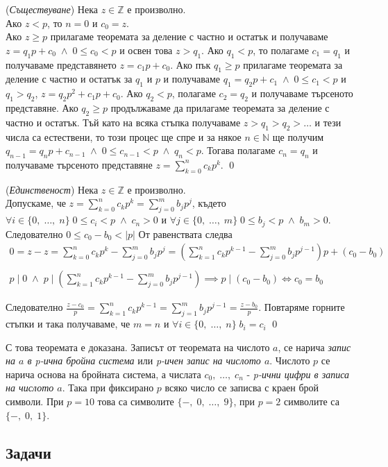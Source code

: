 \documentclass[a4paper, 12pt, oneside]{article}
\theoremstyle{definition}
\renewenvironment{proof}{\noindent{\bf Доказателство.}\hspace*{1em}}{\qed\par}
\newcommand{\Z}{\mathbb{Z}}
\newcommand{\N}{\mathbb{N}}
\begin{document}
\begin{proof}
    (\textit{Съществуване})
    Нека $z \in \Z$ е произволно. \\

    Ако $z < p$, то $n = 0$ и $c_0 = z$. \\

    Ако $z \geq p$ прилагаме теоремата за деление с частно и остатък и получаваме $z = q_1p + c_0 \; \land \; 0 \leq c_0 < p$
    и освен това $z > q_1$. Ако $q_1 < p$, то полагаме $c_1 = q_1$
    и получаваме представянето $z = c_1p + c_0$.
    Ако пък $q_1 \geq p$ прилагаме теоремата за деление с частно и остатък за $q_1$ и $p$ и получаваме
    $q_1 = q_2p + c_1 \; \land \; 0 \leq c_1 < p$ и $q_1 > q_2$, $z = q_2p^2 + c_1p + c_0$. Ако $q_2 < p$,
    полагаме $c_2 = q_2$ и получаваме търсеното представяне. Ако $q_2 \geq p$ продължаваме да прилагаме
    теоремата за деление с частно и остатък. Тъй като на всяка стъпка получаваме $z > q_1 > q_2 > \dots$
    и тези числа са естествени, то този процес ще спре и за някое $n \in \N$ ще получим
    $q_{n - 1} = q_np + c_{n - 1} \; \land \; 0 \leq c_{n - 1} < p \; \land \; q_n < p$.
    Тогава полагаме $c_n = q_n$ и получаваме търсеното представяне $z = \displaystyle\sum_{k = 0}^n c_k p^k$.
\end{proof}

\begin{proof}
    (\textit{Единственост})
    Нека $z \in \Z$ е произволно. \\
    Допускаме, че $z = \displaystyle\sum_{k = 0}^n c_k p^k = \displaystyle\sum_{j = 0}^m b_j p^j$, където \\
    $\forall i \in \{0, \; \dots, \; n\} \; 0 \leq c_i < p \; \land \; c_n > 0$ и  $\forall j \in \{0, \; \dots, \; m\} \; 0 \leq b_j < p \; \land \; b_m > 0$.
    Следователно $0 \leq c_0 - b_0 < |p|$
    От равенствата следва
    \begin{align*}
        0 = z - z = \displaystyle\sum_{k = 0}^n c_k p^k - \displaystyle\sum_{j = 0}^m b_j p^j = \left(\displaystyle\sum_{k = 1}^n c_k p^{k - 1} - \displaystyle\sum_{j = 0}^m b_j p^{j - 1}\right)p + (c_0 - b_0) \\\\
        p \mid 0 \; \land \; p \;  \Big| \; \left(\displaystyle\sum_{k = 1}^n c_k p^{k - 1} - \displaystyle\sum_{j = 0}^m b_j p^{j - 1}\right) \implies p \mid (c_0 - b_0) \iff c_0 = b_0
    \end{align*}

    Следователно $\displaystyle\frac{z - c_0}{p} = \displaystyle\sum_{k = 1}^n c_k p^{k - 1} = \displaystyle\sum_{j = 1}^m b_j p^{j - 1} = \displaystyle\frac{z - b_0}{p}$. Повтаряме горните стъпки
    и така получаваме, че $m = n$ и $\forall i \in \{0, \; \dots, \; n\} \; b_i = c_i$
\end{proof}
С това теоремата е доказана. Записът от теоремата на числото $a$,
се нарича \textit{запис на $a$ в p-ична бройна система} или \textit{p-ичен запис на числото $a$}.
Числото $p$ се нарича основа на бройната система, а числата $c_0, \; \dots, \; c_n$ -
\textit{p-ични цифри в записа на числото $a$}. Така при фиксирано $p$ всяко число се записва
с краен брой символи. При $p = 10$ това са символите $\{-, \; 0, \; \dots, \; 9\}$, при $p = 2$
символите са $\{-, \; 0, \; 1\}$.

\subsection{Задачи}
\end{document}
